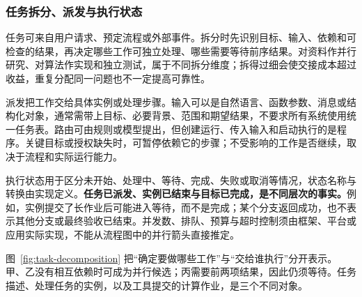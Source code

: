 \documentclass[11pt,a4paper]{article}
\begin{document}
\subsubsection{任务拆分、派发与执行状态}

任务可来自用户请求、预定流程或外部事件。拆分时先识别目标、输入、依赖和可检查的结果，再决定哪些工作可独立处理、哪些需要等待前序结果。对资料作并行研究、对算法作实现和独立测试，属于不同拆分维度；拆得过细会使交接成本超过收益，重复分配同一问题也不一定提高可靠性。

派发把工作交给具体实例或处理步骤。输入可以是自然语言、函数参数、消息或结构化对象，通常需带上目标、必要背景、范围和期望结果，不要求所有系统使用统一任务表。路由可由规则或模型提出，但创建运行、传入输入和启动执行的是程序。关键目标或授权缺失时，可暂停依赖它的步骤；不受影响的工作是否继续，取决于流程和实际运行能力。

执行状态用于区分未开始、处理中、等待、完成、失败或取消等情况，状态名称与转换由实现定义。\textbf{任务已派发、实例已结束与目标已完成，是不同层次的事实。}例如，实例提交了长作业后可能进入等待，而不是完成；某个分支返回成功，也不表示其他分支或最终验收已结束。并发数、排队、预算与超时控制须由框架、平台或应用实际实现，不能从流程图中的并行箭头直接推定。


图~\ref{fig:task-decomposition} 把“确定要做哪些工作”与“交给谁执行”分开表示。甲、乙没有相互依赖时可成为并行候选；丙需要前两项结果，因此仍须等待。任务描述、处理任务的实例，以及工具提交的计算作业，是三个不同对象。
\end{document}
